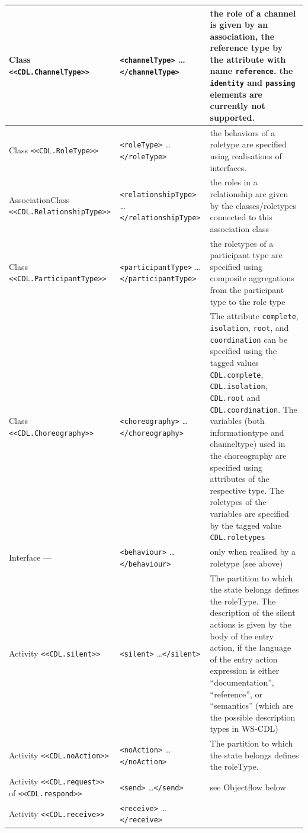 \documentclass[pdftex]{scrartcl}
\newcommand{\st}[1]{\texttt{<<#1>>}}
\newcommand{\xml}[1]{\texttt{<#1>} \ldots \texttt{</#1>}}
\begin{document}
\begin{longtable}{p{5cm}|p{4.5cm}|p{5.5cm}}
  \\\hline
  Class              \st{CDL.ChannelType}      & \xml{channelType}
  & the role of a channel is given by an association, the reference
  type by the attribute with name \texttt{reference}. the
  \texttt{identity} and \texttt{passing} elements are currently not
  supported. 
  \\\hline
  Class              \st{CDL.RoleType}         & \xml{roleType}         &
  the behaviors of a roletype are specified using realisations of
  interfaces. \\\hline 
  AssociationClass   \st{CDL.RelationshipType} & \xml{relationshipType} &
  the roles in a relationship are given by the classes/roletypes
  connected to this association class\\\hline 
  Class              \st{CDL.ParticipantType}  & \xml{participantType}  &
  the roletypes of a participant type are specified using composite
  aggregations from the participant type to the role type\\\hline
  Class              \st{CDL.Choreography}     & \xml{choreography} &
  The attribute \texttt{complete}, \texttt{isolation}, \texttt{root},
  and \texttt{coordination}  can be specified using the tagged
  values \texttt{CDL.complete}, \texttt{CDL.isolation},
  \texttt{CDL.root} and \texttt{CDL.coordination}.  The variables
  (both informationtype and channeltype) used in the choreography are
  specified using attributes of the respective type. The roletypes of
  the variables are specified by the tagged value \texttt{CDL.roletypes}
  \\\hline
  Interface          ---                       & \xml{behaviour}
  & only when realised by a roletype (see above)
  \\\hline
  Activity           \st{CDL.silent}           & \xml{silent} & The
  partition to which the state belongs defines the roleType. The
  description of the silent actions is given by the body of the entry
  action, if the language of the entry action expression is either
  ``documentation'', ``reference'', or ``semantics'' (which are the
  possible description types in WS-CDL)
  \\\hline
  Activity           \st{CDL.noAction}         & \xml{noAction} & The
  partition to which the state belongs defines the roleType.
  \\\hline
  Activity           \st{CDL.request} of \st{CDL.respond}  & \xml{send}
  & see Objectflow below
  \\\hline
  Activity           \st{CDL.receive}          & \xml{receive}

\end{longtable}
\end{document}
